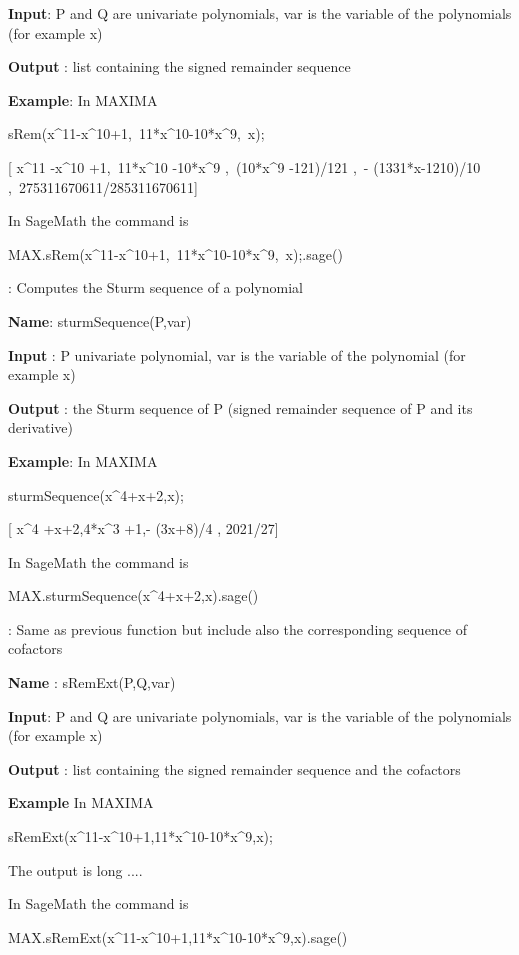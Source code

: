 \documentclass{article}
\begin{document}
{\bf Input}: P and Q are univariate polynomials, var is the variable of the polynomials (for example x)
  
  {\bf Output} : list containing the signed remainder sequence
  
{\bf Example}: In MAXIMA

sRem(x\^{}11-x\^{}10+1,\ 11*x\^{}10-10*x\^{}9,\ x);

[ x\^{}{11} -x\^{}{10} +1,\ 11*x\^{}{10} -10*x\^{}{9} ,\ (10*x\^{}{9}
    -121)/121 ,\ - (1331*x-1210)/10 ,\ 275311670611/285311670611]
  
  \noindent In SageMath the command is
  
  MAX.sRem(x\^{}11-x\^{}10+1,\ 11*x\^{}10-10*x\^{}9,\ x);.sage()
  

:
  Computes the Sturm sequence of a polynomial
  
{\bf Name}: sturmSequence(P,var)
  
{\bf Input} : P univariate  polynomial, var is the variable of the polynomial (for example x)
  
{\bf Output} : the Sturm sequence of P (signed remainder sequence of P and its
  derivative)
  
{\bf Example}: In MAXIMA

sturmSequence(x\^{}4+x+2,x);

 [ x\^{}{4} +x+2,4*x\^{}{3} +1,- (3x+8)/4 , 2021/27]
  
  \noindent In SageMath the command is
  
  MAX.sturmSequence(x\^{}4+x+2,x).sage()



: 
  Same as previous function but include also the corresponding sequence of
  cofactors
  
  
{\bf Name} : sRemExt(P,Q,var)
  
{\bf Input}: P and Q are univariate polynomials, var is the variable of the polynomials (for example x)
  
  {\bf Output} : list containing the signed remainder sequence and the cofactors
 
  {\bf Example}  In MAXIMA
  
 sRemExt(x\^{}11-x\^{}10+1,11*x\^{}10-10*x\^{}9,x);

\noindent The output is long ....
  
   In SageMath the command is
  
 MAX.sRemExt(x\^{}11-x\^{}10+1,11*x\^{}10-10*x\^{}9,x).sage()
  
\end{document}
